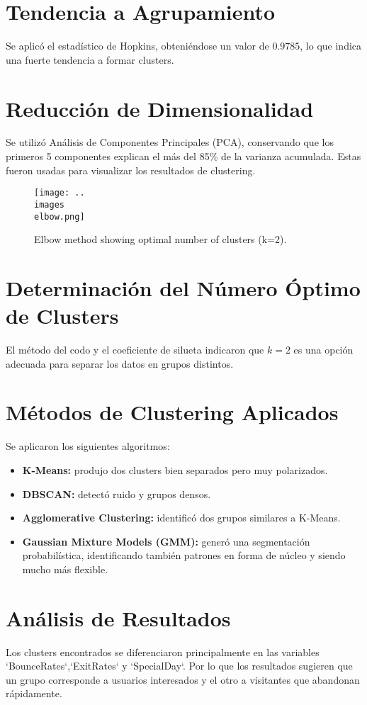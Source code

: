 \documentclass[conference]{IEEEtran}
\begin{document}
\section{Tendencia a Agrupamiento}
Se aplicó el estadístico de Hopkins, obteniéndose un valor de $0.9785$, lo que indica una fuerte tendencia a formar clusters.
\section{Reducción de Dimensionalidad}
Se utilizó Análisis de Componentes Principales (PCA), conservando que los primeros 5 componentes explican el más del 85\% de la varianza acumulada. Estas fueron usadas para visualizar los resultados de clustering.
\begin{figure}[htbp]
    \centering
    \texttt{[image: ..\\images\\elbow.png]}
    \caption{Elbow method showing optimal number of clusters (k=2).}
    \label{fig:elbow}
\end{figure}

\section{Determinación del Número Óptimo de Clusters}
El método del codo y el coeficiente de silueta indicaron que $k=2$ es una opción adecuada para separar los datos en grupos distintos.


\section{Métodos de Clustering Aplicados}
Se aplicaron los siguientes algoritmos:

\begin{itemize}
    \item \textbf{K-Means:} produjo dos clusters bien separados pero muy polarizados.
    \item \textbf{DBSCAN:} detectó ruido y grupos densos.
    \item \textbf{Agglomerative Clustering:} identificó dos grupos similares a K-Means.
    \item \textbf{Gaussian Mixture Models (GMM):} generó una segmentación probabilística, identificando también patrones en forma de núcleo y siendo mucho más flexible.
\end{itemize}

\section{Análisis de Resultados}
Los clusters encontrados se diferenciaron principalmente en las variables `BounceRates`,`ExitRates` y `SpecialDay`. Por lo que los resultados sugieren que un grupo corresponde a usuarios interesados y el otro a visitantes que abandonan rápidamente.
\end{document}
